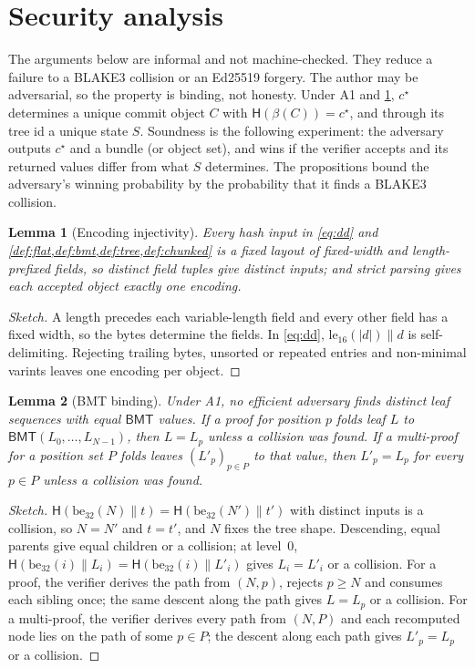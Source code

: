 \documentclass[10pt,letterpaper]{article}
\newtheorem{lemma}{Lemma}
\theoremstyle{remark}
\newcommand{\Hb}{\mathsf{H}}
\newcommand{\BMT}{\mathsf{BMT}}
\newcommand{\cc}{\mathbin{\|}}
\begin{document}
\section{Security analysis}\label{sec:security}

The arguments below are informal and not machine-checked. They reduce a failure
to a BLAKE3 collision or an Ed25519 forgery. The author may be adversarial, so
the property is binding, not honesty. Under A1 and \cref{lem:inj}, $c^\star$
determines a unique commit object $C$ with $\Hb(\beta(C)) = c^\star$, and
through its tree id a unique state $S$. Soundness is the following experiment:
the adversary outputs $c^\star$ and a bundle (or object set), and wins if the
verifier accepts and its returned values differ from what $S$ determines. The
propositions bound the adversary's winning probability by the probability that
it finds a BLAKE3 collision.

\begin{lemma}[Encoding injectivity]\label{lem:inj}
Every hash input in \cref{eq:dd} and \cref{def:flat,def:bmt,def:tree,def:chunked}
is a fixed layout of fixed-width and length-prefixed fields, so distinct field
tuples give distinct inputs; and strict parsing gives each accepted object
exactly one encoding.
\end{lemma}
\begin{proof}[Sketch]
A length precedes each variable-length field and every other field has a fixed
width, so the bytes determine the fields. In \cref{eq:dd},
$\mathrm{le}_{16}(|d|) \cc d$ is self-delimiting. Rejecting trailing bytes,
unsorted or repeated entries and non-minimal varints leaves one encoding per
object.
\end{proof}

\begin{lemma}[BMT binding]\label{lem:bmt}
Under A1, no efficient adversary finds distinct leaf sequences with equal
$\BMT$ values. If a proof for position $p$ folds leaf $L$ to
$\BMT(L_0, \dots, L_{N-1})$, then $L = L_p$ unless a collision was found. If a
multi-proof for a position set $P$ folds leaves $(L'_p)_{p \in P}$ to that
value, then $L'_p = L_p$ for every $p \in P$ unless a collision was found.
\end{lemma}
\begin{proof}[Sketch]
$\Hb(\mathrm{be}_{32}(N) \cc t) = \Hb(\mathrm{be}_{32}(N') \cc t')$ with
distinct inputs is a collision, so $N = N'$ and $t = t'$, and $N$ fixes the
tree shape. Descending, equal parents give equal children or a collision; at
level~0, $\Hb(\mathrm{be}_{32}(i) \cc L_i) = \Hb(\mathrm{be}_{32}(i) \cc L'_i)$
gives $L_i = L'_i$ or a collision. For a proof, the verifier derives the path
from $(N, p)$, rejects $p \ge N$ and consumes each sibling once; the same
descent along the path gives $L = L_p$ or a collision. For a multi-proof, the
verifier derives every path from $(N, P)$ and each recomputed node lies on the
path of some $p \in P$; the descent along each path gives $L'_p = L_p$ or a
collision.
\end{proof}
\end{document}
